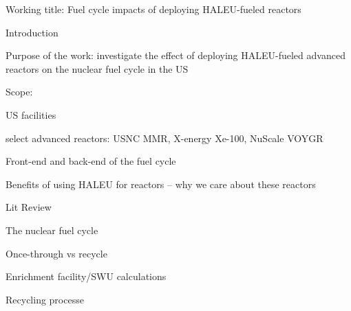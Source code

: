 \documentclass{report}
\begin{document}
\begin{outline}
\item Working title: Fuel cycle impacts of deploying \gls{HALEU}-fueled reactors

\item Introduction
\begin{outline}
    \item Purpose of the work: investigate the effect of deploying HALEU-fueled 
          advanced reactors on the nuclear fuel cycle in the US 
    \item Scope:
    \begin{outline}
        \item US facilities
        \item select advanced reactors: USNC MMR, X-energy Xe-100, NuScale VOYGR
        \item Front-end and back-end of the fuel cycle
    \end{outline}
    \item Benefits of using HALEU for reactors -- why we care about these reactors
\end{outline}

\item Lit Review
\begin{outline}
    \item The nuclear fuel cycle
    \begin{outline}
          \item Once-through vs recycle
          \item Enrichment facility/SWU calculations
          \item Recycling processe
    \end{outline}
    

\end{outline}
\end{outline}
\end{document}
